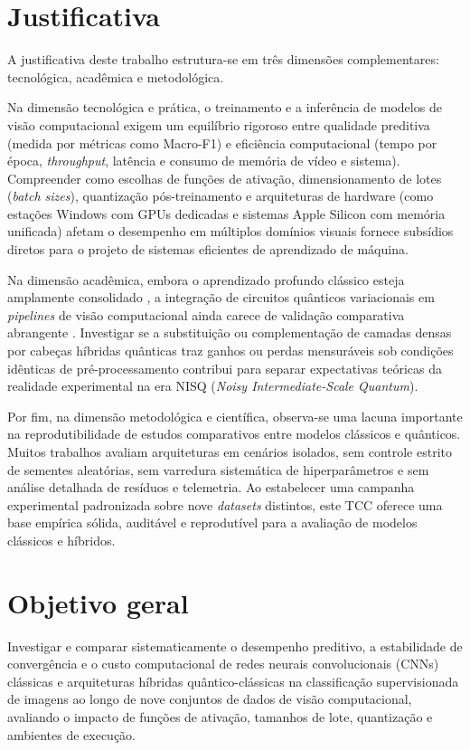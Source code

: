 \documentclass[
    12pt,
    openright,
    oneside,
    a4paper,
    english,
    brazil
]{abntex2}
\begin{document}
\section{Justificativa}

A justificativa deste trabalho estrutura-se em três dimensões complementares: tecnológica, acadêmica e metodológica.

Na dimensão tecnológica e prática, o treinamento e a inferência de modelos de visão computacional exigem um equilíbrio rigoroso entre qualidade preditiva (medida por métricas como Macro-F1) e eficiência computacional (tempo por época, \textit{throughput}, latência e consumo de memória de vídeo e sistema). Compreender como escolhas de funções de ativação, dimensionamento de lotes (\textit{batch sizes}), quantização pós-treinamento e arquiteturas de hardware (como estações Windows com GPUs dedicadas e sistemas Apple Silicon com memória unificada) afetam o desempenho em múltiplos domínios visuais fornece subsídios diretos para o projeto de sistemas eficientes de aprendizado de máquina.

Na dimensão acadêmica, embora o aprendizado profundo clássico esteja amplamente consolidado \cite{LeCun2015}, a integração de circuitos quânticos variacionais em \textit{pipelines} de visão computacional ainda carece de validação comparativa abrangente \cite{cerezo2021variational,long2025qcqcnn}. Investigar se a substituição ou complementação de camadas densas por cabeças híbridas quânticas traz ganhos ou perdas mensuráveis sob condições idênticas de pré-processamento contribui para separar expectativas teóricas da realidade experimental na era NISQ (\textit{Noisy Intermediate-Scale Quantum}).

Por fim, na dimensão metodológica e científica, observa-se uma lacuna importante na reprodutibilidade de estudos comparativos entre modelos clássicos e quânticos. Muitos trabalhos avaliam arquiteturas em cenários isolados, sem controle estrito de sementes aleatórias, sem varredura sistemática de hiperparâmetros e sem análise detalhada de resíduos e telemetria. Ao estabelecer uma campanha experimental padronizada sobre nove \textit{datasets} distintos, este TCC oferece uma base empírica sólida, auditável e reprodutível para a avaliação de modelos clássicos e híbridos.

\section{Objetivo geral}

Investigar e comparar sistematicamente o desempenho preditivo, a estabilidade de convergência e o custo computacional de redes neurais convolucionais (CNNs) clássicas e arquiteturas híbridas quântico-clássicas na classificação supervisionada de imagens ao longo de nove conjuntos de dados de visão computacional, avaliando o impacto de funções de ativação, tamanhos de lote, quantização e ambientes de execução.
\end{document}
